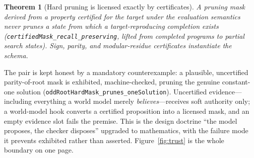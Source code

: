 \documentclass[11pt]{article}
\newcommand{\code}[1]{\texttt{#1}}
\newtheorem{theorem}{Theorem}
\begin{document}
\begin{theorem}[Hard pruning is licensed exactly by certificates]
A pruning mask derived from a property \emph{certified for the target under the
evaluation semantics} never prunes a state from which a target-reproducing completion
exists (\code{certifiedMask\_recall\_preserving}, lifted from completed programs to
partial search states). Sign, parity, and modular-residue certificates instantiate the
schema.
\end{theorem}

The pair is kept honest by a mandatory counterexample: a plausible, uncertified
parity-of-root mask is exhibited, machine-checked, pruning the genuine constant-one
solution (\code{oddRootHardMask\_prunes\_oneSolution}). Uncertified evidence---including
everything a world model merely \emph{believes}---receives soft authority only; a
world-model hook converts a certified proposition into a licensed mask, and an empty
evidence slot fails the premise. This is the design doctrine ``the model proposes, the
checker disposes'' upgraded to mathematics, with the failure mode it prevents exhibited
rather than asserted. Figure~\ref{fig:trust} is the whole boundary on one page.
\end{document}
